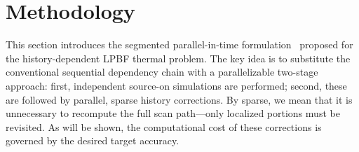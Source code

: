 \documentclass[conference]{IEEEtran}
\begin{document}









\section{Methodology}
\label{seq:methodology}



This section introduces the segmented parallel-in-time formulation \method\ proposed for the history-dependent LPBF thermal problem. The key idea is to substitute the conventional sequential dependency chain with a parallelizable two-stage approach: first, independent source-on simulations are performed; second, these are followed by parallel, sparse history corrections. By sparse, we mean that it is unnecessary to recompute the full scan path—only localized portions must be revisited. As will be shown, the computational cost of these corrections is governed by the desired target accuracy.  
\end{document}
